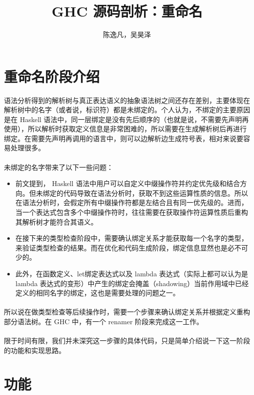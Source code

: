 \documentclass{article}
\author{陈逸凡，吴昊泽}
\title{GHC 源码剖析：重命名}
\begin{document}
	\maketitle
	\section{重命名阶段介绍}
	\paragraph{}
	语法分析\cite{ghcrename}得到的解析树与真正表达语义的抽象语法树之间还存在差别，主要体现在解析树中的名字（或者说，标识符）都是未绑定的。个人认为，不绑定的主要原因是在 Haskell 语法中，同一层绑定是没有先后顺序的（也就是说，不需要先声明再使用），所以解析时获取定义信息是非常困难的，所以需要在生成解析树后再进行绑定。在需要先声明再调用的语言中，则可以边解析边生成符号表，相对来说要容易处理很多。
	\paragraph{}
	未绑定的名字带来了以下一些问题：
	\begin{itemize}
		\item 前文提到， Haskell 语法中用户可以自定义中缀操作符并约定优先级和结合方向。但未绑定的代码导致在语法分析时，获取不到这些运算性质的信息。所以在语法分析时，会假定所有中缀操作符都是左结合且有同一优先级的。进而，当一个表达式包含多个中缀操作符时，往往需要在获取操作符运算性质后重构其解析树才能符合其语义。
		\item 在接下来的类型检查阶段中，需要确认绑定关系才能获取每一个名字的类型，来验证类型检查的结果。而在优化和代码生成阶段，绑定信息显然也是必不可少的。
		\item 此外，在函数定义、let绑定表达式以及 lambda 表达式（实际上都可以认为是 lambda 表达式的变形）中产生的绑定会掩盖（shadowing）当前作用域中已经定义的相同名字的绑定，这也是需要处理的问题之一。
	\end{itemize}
	\paragraph{}
	所以说在做类型检查等后续操作时，需要一个步骤来确认绑定关系并根据定义重构部分语法树。在 GHC 中，有一个 renamer 阶段来完成这一工作。
	\paragraph{}
	限于时间有限，我们并未深究这一步骤的具体代码，只是简单介绍说一下这一阶段的功能和实现思路。
	\section{功能}
\end{document}
